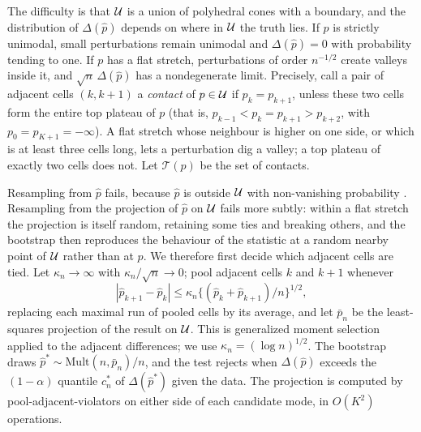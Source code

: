The difficulty is that $\mathcal{U}$ is a union of polyhedral cones with a boundary, and the distribution of $\Delta(\hat p)$ depends on where in $\mathcal{U}$ the truth lies. If $p$ is strictly unimodal, small perturbations remain unimodal and $\Delta(\hat p)=0$ with probability tending to one. If $p$ has a flat stretch, perturbations of order $n^{-1/2}$ create valleys inside it, and $\sqrt n\,\Delta(\hat p)$ has a nondegenerate limit. Precisely, call a pair of adjacent cells $(k,k+1)$ a \emph{contact} of $p\in\mathcal{U}$ if $p_k=p_{k+1}$, unless these two cells form the entire top plateau of $p$ (that is, $p_{k-1}<p_k=p_{k+1}>p_{k+2}$, with $p_0=p_{K+1}=-\infty$). A flat stretch whose neighbour is higher on one side, or which is at least three cells long, lets a perturbation dig a valley; a top plateau of exactly two cells does not. Let $\mathcal T(p)$ be the set of contacts.

Resampling from $\hat p$ fails, because $\hat p$ is outside $\mathcal{U}$ with non-vanishing probability \citep{Andrews2000}. Resampling from the projection of $\hat p$ on $\mathcal{U}$ fails more subtly: within a flat stretch the projection is itself random, retaining some ties and breaking others, and the bootstrap then reproduces the behaviour of the statistic at a random nearby point of $\mathcal{U}$ rather than at $p$. We therefore first decide which adjacent cells are tied. Let $\kappa_n\to\infty$ with $\kappa_n/\sqrt n\to0$; pool adjacent cells $k$ and $k+1$ whenever
\[
|\hat p_{k+1}-\hat p_k|\le\kappa_n\{(\hat p_k+\hat p_{k+1})/n\}^{1/2},
\]
replacing each maximal run of pooled cells by its average, and let $\bar p_n$ be the least-squares projection of the result on $\mathcal{U}$. This is generalized moment selection \citep{AndrewsSoares2010} applied to the adjacent differences; we use $\kappa_n=(\log n)^{1/2}$. The bootstrap draws $\hat p^\ast\sim\mathrm{Mult}(n,\bar p_n)/n$, and the test rejects when $\Delta(\hat p)$ exceeds the $(1-\alpha)$ quantile $c_n^\ast$ of $\Delta(\hat p^\ast)$ given the data. The projection is computed by pool-adjacent-violators on either side of each candidate mode, in $O(K^2)$ operations.

